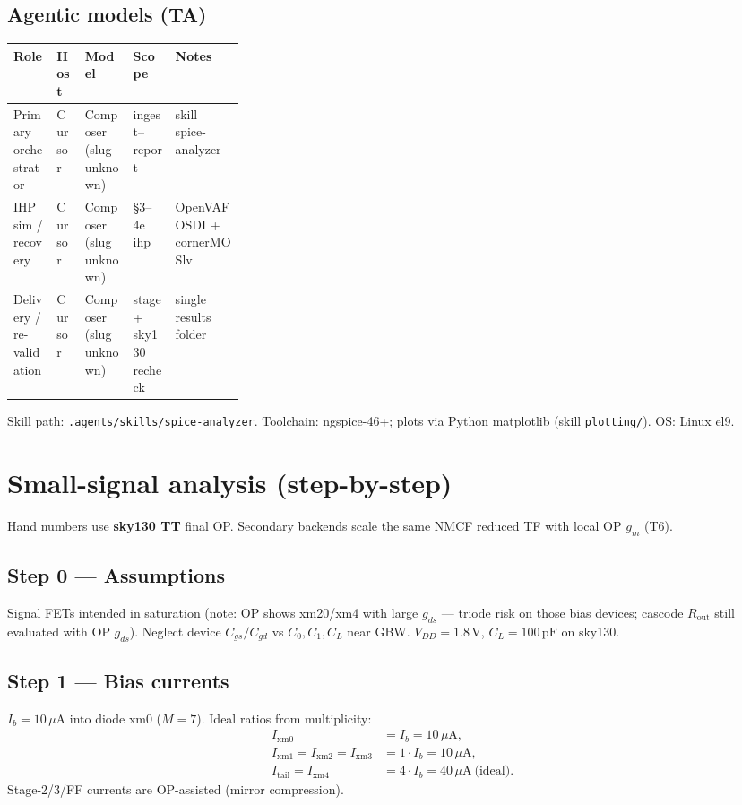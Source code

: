 \documentclass[11pt]{article}
\begin{document}
\subsection{Agentic models (TA)}
\begin{center}
{\small
\begin{tabular}{@{}llllp{0.30\linewidth}@{}}
\toprule
Role & Host & Model & Scope & Notes \\
\midrule
Primary orchestrator & Cursor & Composer (slug unknown) & ingest--report & skill spice-analyzer \\
IHP sim / recovery & Cursor & Composer (slug unknown) & §3--4e ihp & OpenVAF OSDI + cornerMOSlv \\
Delivery / re-validation & Cursor & Composer (slug unknown) & stage + sky130 recheck & single results folder \\
\bottomrule
\end{tabular}}
\end{center}
\footnotesize Skill path: \texttt{.agents/skills/spice-analyzer}.
Toolchain: ngspice-46+; plots via Python matplotlib (skill \texttt{plotting/}).
OS: Linux el9.

\section{Small-signal analysis (step-by-step)}
Hand numbers use \textbf{sky130 TT} final OP. Secondary backends scale the same
NMCF reduced TF with local OP $g_m$ (T6).

\subsection{Step 0 --- Assumptions}
Signal FETs intended in saturation (note: OP shows xm20/xm4 with large $g_{ds}$ ---
triode risk on those bias devices; cascode $R_{\mathrm{out}}$ still evaluated with OP $g_{ds}$).
Neglect device $C_{gs}/C_{gd}$ vs $C_0,C_1,C_L$ near GBW.
$V_{DD}{=}1.8\,\mathrm{V}$, $C_L{=}100\,\mathrm{pF}$ on sky130.

\subsection{Step 1 --- Bias currents}
$I_b{=}10\,\mu\mathrm{A}$ into diode xm0 ($M{=}7$). Ideal ratios from multiplicity:
\begin{align*}
I_{\mathrm{xm0}} &= I_b = 10\,\mu\mathrm{A},\\
I_{\mathrm{xm1}}=I_{\mathrm{xm2}}=I_{\mathrm{xm3}} &= 1\cdot I_b = 10\,\mu\mathrm{A},\\
I_{\mathrm{tail}}=I_{\mathrm{xm4}} &= 4\cdot I_b = 40\,\mu\mathrm{A}\ \text{(ideal)}.
\end{align*}
Stage-2/3/FF currents are OP-assisted (mirror compression).
\end{document}
